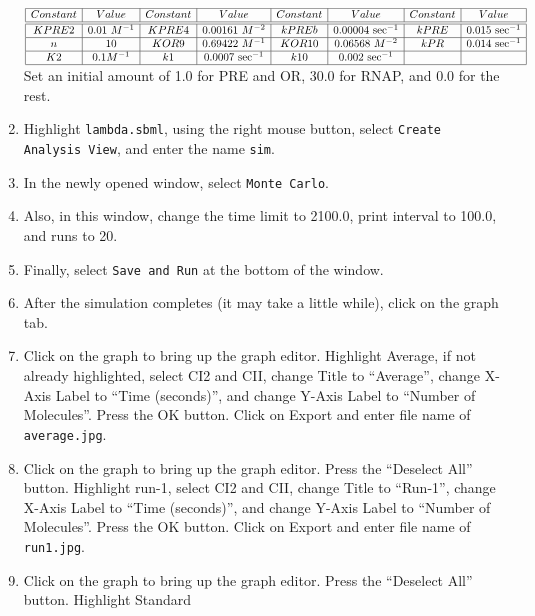 \documentclass[titlepage,11pt]{article}
\begin{document}
\begin{enumerate}
\begin{center}
\begin{math}
\begin{array}{|c|c|c|c|c|c|c|c|}
\hline
Constant & Value & Constant & Value &
Constant & Value & Constant & Value \\ \hline \hline
KPRE2  & 0.01~M^{-1} & KPRE4  & 0.00161~M^{-2} & 
kPREb  & 0.00004~\mathrm{sec}^{-1} & 
kPRE   & 0.015~\mathrm{sec}^{-1} \\ \hline
n         & 10 & KOR9  & 0.69422~M^{-1} & KOR10  & 0.06568~M^{-2} &
kPR    & 0.014~\mathrm{sec}^{-1} \\ \hline
K2       & 0.1 M^{-1} & k1       & 0.0007~\mathrm{sec}^{-1} &
k10    & 0.002~\mathrm{sec}^{-1} & ~ & ~ \\ \hline
\end{array}
\end{math}
Set an initial amount of 1.0 for PRE and OR, 30.0 for RNAP, and 0.0 
for the rest.
\end{center}
\item Highlight {\tt lambda.sbml}, using the right mouse button, select 
      {\tt Create Analysis View}, and enter the name {\tt sim}.
\item In the newly opened window, select {\tt Monte Carlo}.
\item Also, in this window, change the time limit to 2100.0, print interval
      to 100.0, and runs to 20.
\item Finally, select {\tt Save and Run} at the bottom of the window.
\item After the simulation completes (it may take a little while), click on
      the graph tab.
\item Click on the graph to bring up the graph editor.  Highlight Average,
      if not already highlighted, select CI2 and CII, change Title to
      ``Average'', change X-Axis Label to ``Time (seconds)'', and change
      Y-Axis Label to ``Number of Molecules''.  Press the OK button.
      Click on Export and enter file name of {\tt average.jpg}.
\item Click on the graph to bring up the graph editor.  Press the 
      ``Deselect All'' button.  Highlight run-1,
      select CI2 and CII, change Title to ``Run-1'', 
      change X-Axis Label to ``Time (seconds)'', and change
      Y-Axis Label to ``Number of Molecules''.  Press the OK button.
      Click on Export and enter file name of {\tt run1.jpg}.
\item Click on the graph to bring up the graph editor.  
      Press the ``Deselect All'' button.  Highlight Standard

\end{enumerate}
\end{document}
